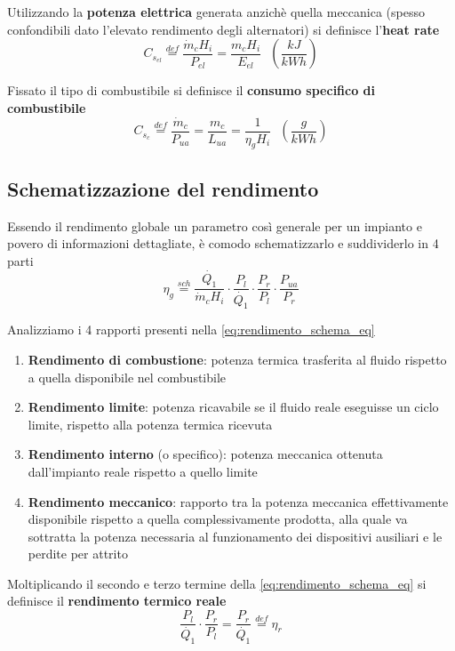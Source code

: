 \documentclass[a4paper,10pt]{article}
\begin{document}
Utilizzando la \textbf{potenza elettrica} generata anzichè quella meccanica
(spesso confondibili dato l'elevato rendimento degli alternatori) si definisce
l'\textbf{heat rate}
\begin{equation}
 C_{s_{el}} \stackrel{def}{=} \frac{\dot{m}_c H_i}{P_{el}} = \frac{m_c H_i}{E_{el}} \ 
 \ \ \left(\frac{kJ}{kWh} \right)
\end{equation}

Fissato il tipo di combustibile si definisce il \textbf{consumo specifico di 
combustibile}
\begin{equation}
C_{s_c} \stackrel{def}{=} \frac{\dot{m}_c}{P_{ua}} = \frac{m_c}{L_{ua}} = \frac{1}
{\eta_gH_i} \ \ \ \left(\frac{g}{kWh} \right)
\end{equation}
\subsection*{Schematizzazione del rendimento}
\label{sec:rendimento_schema}
Essendo il rendimento globale un parametro così generale per un impianto e povero
di informazioni dettagliate, è comodo schematizzarlo e suddividerlo in 4 parti
\begin{equation}
\label{eq:rendimento_schema_eq}
 \eta_g \stackrel{sch}{=} \frac{\dot{Q_1}}{\dot{m}_c H_i}\cdot \frac{P_l}{\dot{Q_1}}
 \cdot \frac{P_r}{P_l}\cdot \frac{P_{ua}}{P_r}
\end{equation}

Analizziamo i 4 rapporti presenti nella \eqref{eq:rendimento_schema_eq}
\begin{enumerate}
\item \textbf{Rendimento di combustione}: potenza termica trasferita al fluido 
rispetto a quella disponibile nel combustibile

\item \textbf{Rendimento limite}:
potenza ricavabile se il fluido reale eseguisse un ciclo limite, rispetto alla 
potenza termica ricevuta

\item \textbf{Rendimento interno} (o specifico): potenza meccanica ottenuta 
dall'impianto reale rispetto a quello limite

\item \textbf{Rendimento meccanico}: rapporto tra la potenza meccanica effettivamente 
disponibile rispetto a quella complessivamente prodotta, alla quale va sottratta la 
potenza necessaria al funzionamento dei dispositivi ausiliari e le perdite per 
attrito
\end{enumerate}

Moltiplicando il secondo e terzo termine della \eqref{eq:rendimento_schema_eq} si 
definisce il \textbf{rendimento termico reale}
\begin{equation}
\label{eq:rendimento_reale}
 \frac{P_l}{\dot{Q_1}}\cdot \frac{P_r}{P_l} = \frac{P_r}{\dot{Q_1}} \stackrel{def}{=} 
 \eta_r
\end{equation}
\end{document}
